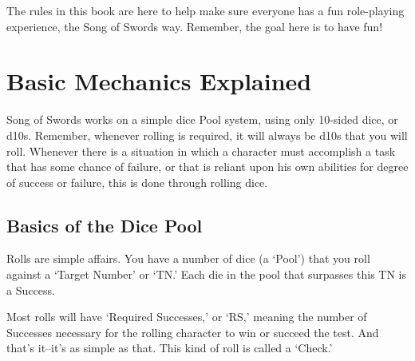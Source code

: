 \documentclass[oneside,11pt,english]{book}
\begin{document}
The rules in this book are here to help make sure everyone has a fun role-playing experience, the Song of Swords way. Remember, the goal here is to have fun! 
\section{Basic Mechanics Explained}
Song of Swords works on a simple dice Pool system, using only 10-sided dice, or d10s. Remember, 
whenever rolling is required, it will always be d10s that you will roll. Whenever there is a situation in 
which a character must accomplish a task that has some chance of failure, or that is reliant upon his own 
abilities for degree of success or failure, this is done through rolling dice. 
\subsection{Basics of the Dice Pool}
Rolls are simple affairs. You have a number of dice (a ‘Pool’) that you roll against a ‘Target Number’ or 
‘TN.’ Each die in the pool that surpasses this TN is a Success. 


Most rolls will have ‘Required Successes,’ or ‘RS,’ meaning the number of Successes necessary for the 
rolling character to win or succeed the test. And that’s it--it’s as simple as that. This kind of roll is called a 
‘Check.’ 
\end{document}
